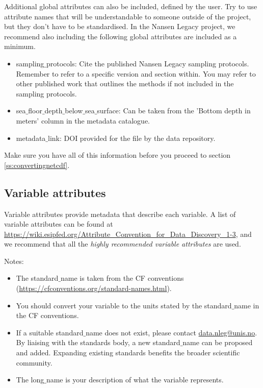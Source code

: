 \documentclass[a4paper,english, 11pt]{article}
\makeatletter
\newcommand{\emailme}{\href{mailto:data.nleg@unis.no}{data.nleg@unis.no}}
\makeatother
\begin{document}
Additional global attributes can also be included, defined by the user. Try to use attribute names that will be understandable to someone outside of the project, but they don't have to be standardised. In the Nansen Legacy project, we recommend also including the following global attributes are included as a minimum. 

\begin{itemize}
\item {sampling$\_$protocols}: Cite the published Nansen Legacy sampling protocols. Remember to refer to a specific version and section within. You may refer to other published work that outlines the methods if not included in the sampling protocols.
\item {sea$\_$floor$\_$depth$\_$below$\_$sea$\_$surface}: Can be taken from the 'Bottom depth in meters' column in the metadata catalogue.
\item {metadata$\_$link}: DOI provided for the file by the data repository.
\end{itemize}   

Make sure you have all of this information before you proceed to section \ref{ss:convertingnetcdf}.

\subsection{Variable attributes}
\label{ss:variableattributes}

Variable attributes provide metadata that describe each variable. A list of variable attributes can be found at \url{https://wiki.esipfed.org/Attribute_Convention_for_Data_Discovery_1-3}, and we recommend that all the \textit{highly recommended variable attributes} are used.

Notes:
\begin{itemize}
\item The standard$\_$name is taken from the CF conventions (\url{https://cfconventions.org/standard-names.html}). 
\item You should convert your variable to the units stated by the standard$\_$name in the CF conventions.
\item If a suitable standard$\_$name does not exist, please contact \emailme . By liaising with the standards body, a new standard$\_$name can be proposed and added. Expanding existing standards benefits the broader scientific community.
\item The long$\_$name is your description of what the variable represents.  
\end{itemize}
\end{document}

